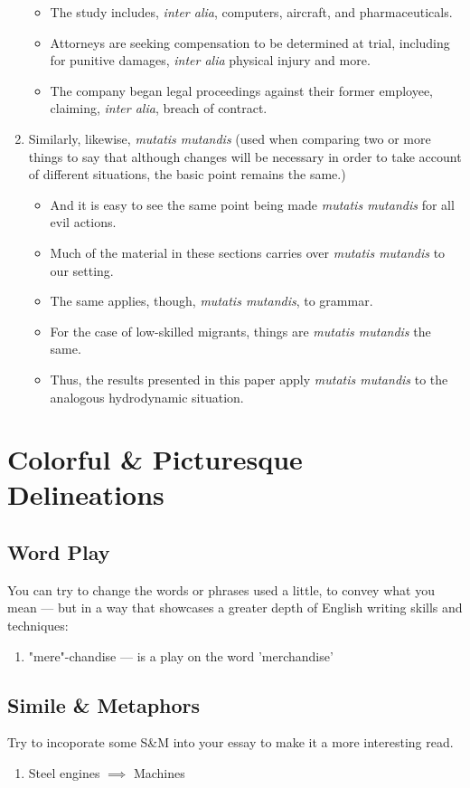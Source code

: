 \documentclass[oneside]{book}
\begin{document}
\begin{enumerate}
    \begin{itemize}
        \item The study includes, \emph{inter alia}, computers, aircraft, and pharmaceuticals.
        \item Attorneys are seeking compensation to be determined at trial, including for punitive damages, \emph{inter alia} physical injury and more.
        \item The company began legal proceedings against their former employee, claiming, \emph{inter alia}, breach of contract.
    \end{itemize}
    \item Similarly, likewise, \emph{mutatis mutandis} (used when comparing two or more things to say that although changes will be necessary in order to take account of different situations, the basic point remains the same.) 
    \begin{itemize}
        \item And it is easy to see the same point being made \emph{mutatis mutandis} for all evil actions.
        \item Much of the material in these sections carries over \emph{mutatis mutandis} to our setting.
        \item The same applies, though, \emph{mutatis mutandis}, to grammar.
        \item For the case of low-skilled migrants, things are \emph{mutatis mutandis} the same.
        \item Thus, the results presented in this paper apply \emph{mutatis mutandis} to the analogous hydrodynamic situation.
    \end{itemize}
\end{enumerate}
  \section{Colorful \& Picturesque Delineations}
\subsection{Word Play}
You can try to change the words or phrases used a little, to convey what you mean --- but in a way that showcases a greater depth of English writing skills and techniques:
\begin{enumerate}
    \item "mere"-chandise --- is a play on the word 'merchandise'
\end{enumerate}
\subsection{Simile \& Metaphors}
Try to incoporate some S\&M into your essay to make it a more interesting read.
\begin{enumerate}
    \item Steel engines \( \implies \) Machines
\end{enumerate}
\end{document}

